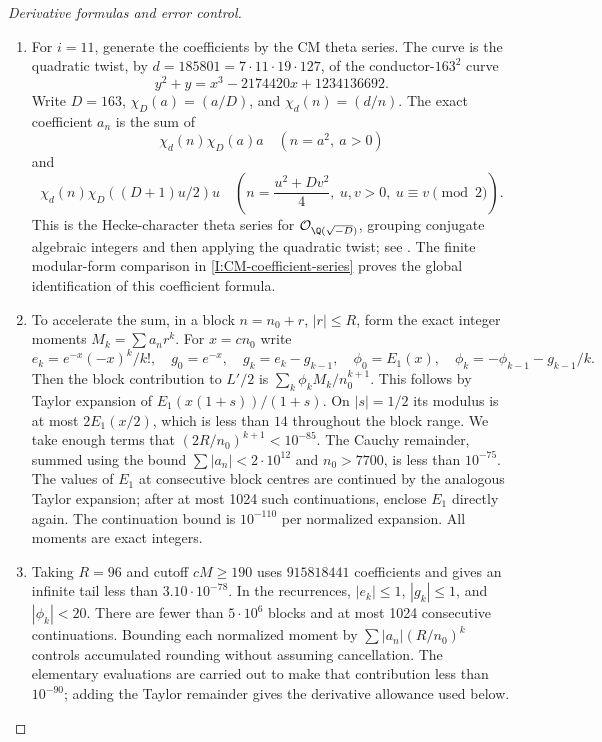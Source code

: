 \begin{proof}[Derivative formulas and error control]
\begin{enumerate}[label=\arabic*.,leftmargin=*]
\item For $i=11$, generate the coefficients by the CM theta series.
The curve is the quadratic twist, by
$d=185801=7\cdot11\cdot19\cdot127$, of the conductor-$163^2$
curve
\[
 y^2+y=x^3-2174420x+1234136692.
\]
Write $D=163$, $\chi_D(a)=(a/D)$, and $\chi_d(n)=(d/n)$.
The exact coefficient $a_n$ is the sum of
\[
 \chi_d(n)\chi_D(a)a \quad(n=a^2,\ a>0)
\]
and
\[
 \chi_d(n)\chi_D((D+1)u/2)u
 \quad\left(n=\frac{u^2+Dv^2}{4},\ u,v>0,
                           \ u\equiv v\pmod2\right).
\]
This is the Hecke-character theta series for
$\mathcal O_{\Q(\sqrt{-D})}$, grouping conjugate algebraic integers
and then applying the quadratic twist; see
\citet[\S3, pp.~4--5]{CrDarmon2009}. The finite modular-form comparison in \cref{I:CM-coefficient-series}
proves the global identification of this coefficient formula.

\item To accelerate the sum, in a block $n=n_0+r$, $|r|\leq R$, form the
exact integer moments $M_k=\sum a_nr^k$. For $x=cn_0$ write
\[
 e_k=e^{-x}(-x)^k/k!,\quad g_0=e^{-x},\quad
 g_k=e_k-g_{k-1},\quad
 \phi_0=E_1(x),\quad\phi_k=-\phi_{k-1}-g_{k-1}/k.
\]
Then the block contribution to $L'/2$ is
$\sum_k\phi_k M_k/n_0^{k+1}$. This follows by Taylor expansion
of $E_1(x(1+s))/(1+s)$. On $|s|=1/2$ its modulus is at most
$2E_1(x/2)$, which is less than $14$ throughout the block range.
We take enough terms that $(2R/n_0)^{k+1}<10^{-85}$.
The Cauchy remainder, summed using the bound
$\sum|a_n|<2\cdot10^{12}$ and $n_0>7700$, is less than
$10^{-75}$. The values of $E_1$ at consecutive block centres
are continued by the analogous Taylor expansion; after at most
1024 such continuations, enclose $E_1$ directly again.
The continuation bound is $10^{-110}$ per normalized expansion.
All moments are exact integers.

\item Taking $R=96$ and cutoff $cM\geq190$ uses
$915818441$ coefficients and gives an infinite tail less than
$3.10\cdot10^{-78}$. In the recurrences,
$|e_k|\leq1$, $|g_k|\leq1$, and $|\phi_k|<20$.
There are fewer than $5\cdot10^6$ blocks and at most 1024
consecutive continuations. Bounding each normalized moment by
$\sum|a_n|(R/n_0)^k$ controls accumulated rounding without
assuming cancellation. The elementary evaluations are carried
out to make that contribution less than $10^{-90}$; adding the
Taylor remainder gives the derivative allowance used below.


\end{enumerate}
\end{proof}
